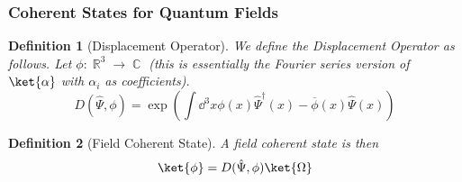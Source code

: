 \documentclass{article}
\DeclareMathOperator{\RR}{\mathbb{R}}
\DeclareMathOperator{\CC}{\mathbb{C}}
\newtheorem{defn}{Definition}
\begin{document}
\subsubsection{Coherent States for Quantum Fields}
\begin{defn}[Displacement Operator]
We define the Displacement Operator as follows. Let $\phi : \RR^3 \to \CC$ (this is essentially the Fourier series version of $\ket{\alpha}$ with $\alpha_i$ as coefficients).
\begin{equation}D(\hat\Psi,\phi) = \exp\left(\int \dd^3 x \phi(x)\hat\Psi^\dagger(x) - \overline \phi(x)\hat\Psi(x)\right)\end{equation}
\end{defn}
\begin{defn}[Field Coherent State]
A field coherent state is then
\begin{equation}\ket{\phi} = D(\hat\Psi,\phi)\ket{\Omega}\end{equation}
\end{defn}
\end{document}
